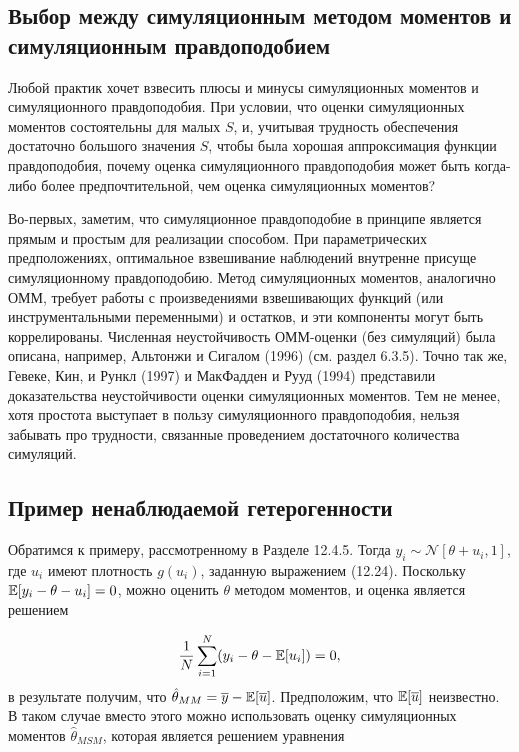 \subsection{Выбор между симуляционным методом моментов и симуляционным правдоподобием}

Любой практик хочет взвесить плюсы и минусы симуляционных моментов и симуляционного правдоподобия. При условии, что оценки симуляционных моментов состоятельны для малых $S$, и, учитывая трудность обеспечения достаточно большого значения $S$, чтобы была хорошая аппроксимация функции правдоподобия, почему оценка симуляционного правдоподобия может быть когда-либо более предпочтительной, чем оценка симуляционных моментов?

Во-первых, заметим, что симуляционное правдоподобие в принципе является прямым и простым для реализации способом. При параметрических предположениях, оптимальное взвешивание наблюдений внутренне присуще симуляционному правдоподобию. Метод симуляционных моментов, аналогично ОММ, требует работы с произведениями взвешивающих функций (или инструментальными переменными) и остатков, и эти компоненты могут быть коррелированы. Численная неустойчивость ОММ-оценки (без симуляций) была описана, например, Альтонжи и Сигалом (1996) (см. раздел 6.3.5). Точно так же, Гевеке, Кин, и Рункл (1997) и МакФадден и Рууд (1994) представили доказательства неустойчивости оценки симуляционных моментов. Тем не менее, хотя простота выступает в пользу симуляционного правдоподобия, нельзя забывать про трудности, связанные проведением достаточного количества симуляций.

\subsection{Пример ненаблюдаемой гетерогенности}

Обратимся к примеру, рассмотренному в Разделе 12.4.5. Тогда $y_i{\sim }\mathcal{N}[\theta+u_i,1]$, где $u_i$ имеют плотность $g(u_i)$, заданную выражением (12.24). Поскольку $\mathbb{E}[y_i-\theta-u_i]=0$, можно оценить $\theta$ методом моментов, и оценка  является решением 

\begin{equation}
\dfrac{1}{N}\sum^{N}_{i=1}(y_i-\theta-\mathbb{E}[u_i])=0,
\end{equation}
в результате получим, что $\hat{\theta}_{MM}=\overline{y}-\mathbb{E}[\overline{u}]$. Предположим, что $\mathbb{E}[\overline{u}]$ неизвестно. В таком случае вместо этого можно использовать оценку симуляционных моментов $\hat{\theta}_{MSM}$, которая является решением уравнения

